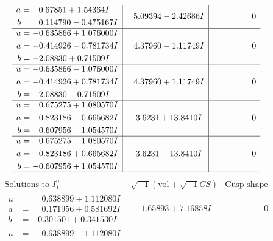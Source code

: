 \documentclass[1p]{elsarticle_modified}
\theoremstyle{definition}
\newcommand{\I}{\sqrt{-1}}
\begin{document}
$$\begin{array}{c|c|c}
\begin{aligned}
a &= \phantom{-}0.67851 + 1.54364 I \\
b &= \phantom{-}0.114790 - 0.475167 I\end{aligned}
 & \phantom{-}5.09394 - 2.42686 I & \phantom{-0.000000 } 0 \\ \hline\begin{aligned}
u &= -0.635866 + 1.076000 I \\
a &= -0.414926 - 0.781734 I \\
b &= -2.08830 + 0.71509 I\end{aligned}
 & \phantom{-}4.37960 - 1.11749 I & \phantom{-0.000000 } 0 \\ \hline\begin{aligned}
u &= -0.635866 - 1.076000 I \\
a &= -0.414926 + 0.781734 I \\
b &= -2.08830 - 0.71509 I\end{aligned}
 & \phantom{-}4.37960 + 1.11749 I & \phantom{-0.000000 } 0 \\ \hline\begin{aligned}
u &= \phantom{-}0.675275 + 1.080570 I \\
a &= -0.823186 - 0.665682 I \\
b &= -0.607956 - 1.054570 I\end{aligned}
 & \phantom{-}3.6231 + 13.8410 I & \phantom{-0.000000 } 0 \\ \hline\begin{aligned}
u &= \phantom{-}0.675275 - 1.080570 I \\
a &= -0.823186 + 0.665682 I \\
b &= -0.607956 + 1.054570 I\end{aligned}
 & \phantom{-}3.6231 - 13.8410 I & \phantom{-0.000000 } 0\\
 \hline 
 \end{array}$$\newpage$$\begin{array}{c|c|c}  
\text{Solutions to }I^u_{1}& \I (\text{vol} + \sqrt{-1}CS) & \text{Cusp shape}\\
 \hline 
\begin{aligned}
u &= \phantom{-}0.638899 + 1.112080 I \\
a &= \phantom{-}0.171956 + 0.581692 I \\
b &= -0.301501 + 0.341530 I\end{aligned}
 & \phantom{-}1.65893 + 7.16858 I & \phantom{-0.000000 } 0 \\ \hline\begin{aligned}
u &= \phantom{-}0.638899 - 1.112080 I \\

\end{aligned}
\end{array}$$
\end{document}
